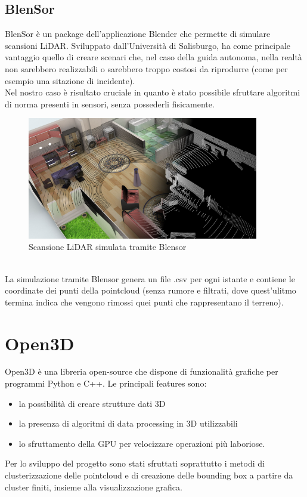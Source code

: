 \documentclass[italian]{report}
\begin{document}
\subsection{BlenSor}
BlenSor è un package dell'applicazione Blender che permette di simulare scansioni LiDAR. Sviluppato dall'Università di Salisburgo, ha come principale vantaggio quello di creare scenari che, nel caso della guida autonoma, nella realtà non sarebbero realizzabili o sarebbero troppo costosi da riprodurre (come per esempio una sitazione di incidente).\\
Nel nostro caso è risultato cruciale in quanto è stato possibile sfruttare algoritmi di norma presenti in sensori, senza possederli fisicamente.\\
\begin{figure}[H]
	\centering
	\includegraphics[width=0.9\textwidth]{Blensor}
	\footnotesize
	\caption{Scansione LiDAR simulata tramite Blensor}
\end{figure}\\
La simulazione tramite Blensor genera un file .csv per ogni istante e contiene le coordinate dei punti della pointcloud (senza rumore e filtrati, dove quest'ulitmo termina indica che vengono rimossi quei punti che rappresentano il terreno).
\section{Open3D}
Open3D è una libreria open-source che dispone di funzionalità grafiche per programmi Python e C++\cite{Open3D}. Le principali features sono:
\begin{itemize}
	\item la possibilità di creare strutture dati 3D
	\item la presenza di algoritmi di data processing in 3D utilizzabili 
	\item lo sfruttamento della GPU per velocizzare operazioni più laboriose.
\end{itemize}
Per lo sviluppo del progetto sono stati sfruttati soprattutto i metodi di clusterizzazione delle pointcloud e di creazione delle bounding box a partire da cluster finiti, insieme alla visualizzazione grafica.
\end{document}

